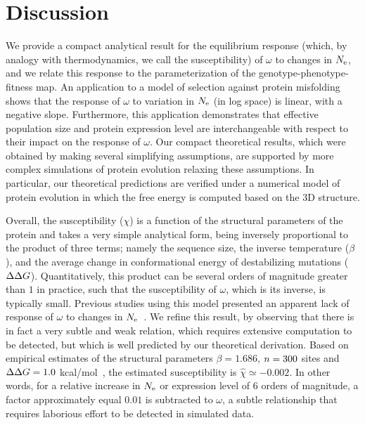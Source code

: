 \section{Discussion}

We provide a compact analytical result for the equilibrium response (which, by analogy with thermodynamics, we call the susceptibility) of $\omega$ to changes in $N_{\text{e}}$, and we relate this response to the parameterization of the genotype-phenotype-fitness map.
An application to a model of selection against protein misfolding shows that the response of $\omega$ to variation in $N_{\text{e}}$ (in log space) is linear, with a negative slope.
Furthermore, this application demonstrates that \gls{effective population size} and protein expression level are interchangeable with respect to their impact on the response of $\omega$.
Our compact theoretical results, which were obtained by making several simplifying assumptions, are supported by more complex simulations of protein evolution relaxing these assumptions.
In particular, our theoretical predictions are verified under a numerical model of protein evolution in which the free energy is computed based on the 3D structure.

Overall, the susceptibility ($\chi$) is a function of the structural parameters of the protein and takes a very simple analytical form, being inversely proportional to the product of three terms;
namely the sequence size, the inverse temperature ($\beta$), and the average change in conformational energy of destabilizing mutations ($\Delta \Delta G$).
Quantitatively, this product can be several orders of magnitude greater than $1$ in practice, such that the susceptibility of $\omega$, which is its inverse, is typically small.
Previous studies using this model presented an apparent lack of response of $\omega$ to changes in $N_{\text{e}}$~\citep{Goldstein2013}.
We refine this result, by observing that there is in fact a very subtle and weak relation, which requires extensive computation to be detected, but which is well predicted by our theoretical derivation.
Based on empirical estimates of the structural parameters $\beta = 1.686$, $n=300$ sites and $\Delta \Delta G = 1.0$ kcal/mol~\citep{Zeldovich2007}, the estimated susceptibility is $\hat{\chi} \simeq -0.002$.
In other words, for a relative increase in $N_{\text{e}}$ or expression level of $6$ orders of magnitude, a factor approximately equal $0.01$ is subtracted to $\omega$, a subtle relationship that requires laborious effort to be detected in simulated data.

